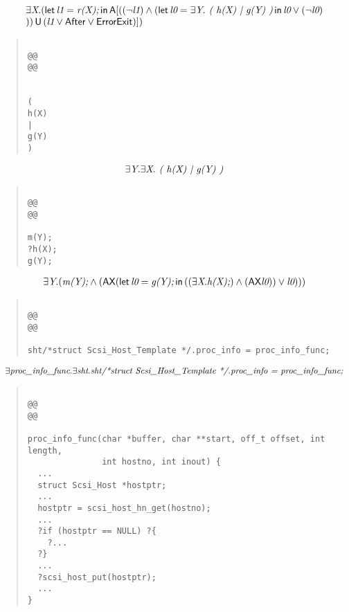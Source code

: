 \documentclass{article}
\newcommand{\U}{\,\mbox{\sf{U}}\,}
\newcommand{\A}{\mbox{\sf{A}}}
\newcommand{\AX}{\mbox{\sf{AX}}}
\newcommand{\mita}[1]{\mbox{\it{{#1}}}}
\newcommand{\msf}[1]{\mbox{\sf{{#1}}}}
\begin{document}
\[\begin{array}{l}
\exists \mita{X} . (\mita{\sf{let}} \, \mita{l1} = \mita{r(X);} \, \mita{\sf{in}} \, \A[((\neg \mita{l1}) \wedge (\mita{\sf{let}} \, \mita{l0} = \exists \mita{Y} . \mita{
(
h(X)
|
g(Y)
)} \, \mita{\sf{in}} \, \mita{l0} \vee (\neg \mita{l0})\\\mbox{}
)) \U (\mita{l1} \vee \msf{After} \vee \msf{ErrorExit})]

)
\end{array}\]

\begin{quote}\begin{verbatim}

@@
@@


(
h(X)
|
g(Y)
)
\end{verbatim}\end{quote}

\[\begin{array}{l}
\exists \mita{Y} . \exists \mita{X} . \mita{
(
h(X)
|
g(Y)
)}
\end{array}\]

\begin{quote}\begin{verbatim}

@@
@@

m(Y);
?h(X);
g(Y);
\end{verbatim}\end{quote}

\[\begin{array}{l}
\exists \mita{Y} . (\mita{m(Y);} \wedge (\AX(\mita{\sf{let}} \, \mita{l0} = \mita{g(Y);} \, \mita{\sf{in}} \, ((\exists \mita{X} . \mita{h(X);}) \wedge (\AX\mita{l0})) \vee \mita{l0}
)))
\end{array}\]

\begin{quote}\begin{verbatim}

@@
@@

sht/*struct Scsi_Host_Template */.proc_info = proc_info_func;
\end{verbatim}\end{quote}

\[\begin{array}{l}
\exists \mita{proc\_info\_func} . \exists \mita{sht} . \mita{sht/*struct Scsi\_Host\_Template */.proc\_info = proc\_info\_func;}
\end{array}\]

\begin{quote}\begin{verbatim}

@@
@@

proc_info_func(char *buffer, char **start, off_t offset, int length,
               int hostno, int inout) {
  ...
  struct Scsi_Host *hostptr;
  ...
  hostptr = scsi_host_hn_get(hostno);
  ...
  ?if (hostptr == NULL) ?{
    ?...
  ?}
  ...
  ?scsi_host_put(hostptr);
  ...
}
\end{verbatim}\end{quote}
\end{document}
